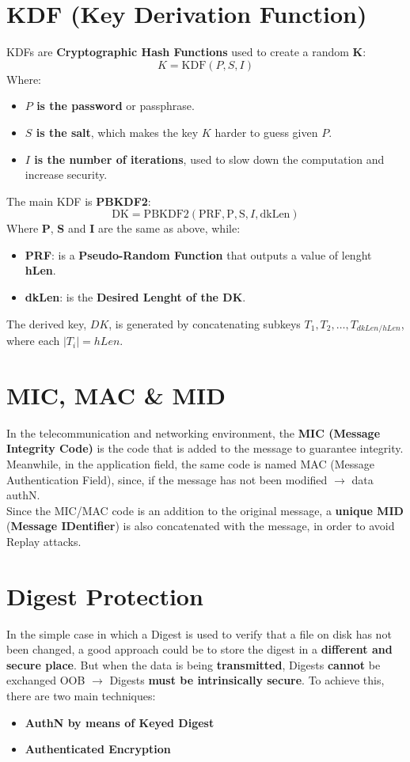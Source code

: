 \section{KDF (Key Derivation Function)}
KDFs are \textbf{Cryptographic Hash Functions} used to create a random \textbf{K}:
\[
K = \text{KDF}(P, S, I)
\]
Where:
\begin{itemize}
    \item \textbf{\( P \) is the password} or passphrase.
    \item \textbf{\( S \) is the salt}, which makes the key \( K \) harder to guess given \( P \).
    \item \textbf{\( I \) is the number of iterations}, used to slow down the computation and increase security.
\end{itemize}
\noindent
\begin{customquote}
The main KDF is \textbf{PBKDF2}:
\[
\text{DK} = \text{PBKDF2}(\text{PRF}, \text{P}, \text{S}, I, \text{dkLen})
\]
Where \textbf{P}, \textbf{S} and \textbf{I} are the same as above, while:
\begin{itemize}
    \item \textbf{PRF}: is a \textbf{Pseudo-Random Function} that outputs a value of lenght \textbf{hLen}.
    \item \textbf{dkLen}: is the \textbf{Desired Lenght of the DK}.
\end{itemize}
The derived key, \( DK \), is generated by concatenating subkeys \( T_1, T_2, \dots, T_{dkLen/hLen} \), where each \( |T_i| = hLen \).
\end{customquote}
\noindent{\color{gray!50}\rule{\textwidth}{0.5pt}}
\section{MIC, MAC \& MID}
In the telecommunication and networking environment, the \textbf{MIC (Message Integrity Code)} is the code that is added to the message to guarantee integrity. Meanwhile, in the application
field, the same code is named MAC (Message Authentication Field), since, if the message
has not been modified \(\rightarrow \) data authN.\\
Since the MIC/MAC code is an addition to the original message, a \textbf{unique MID} (\textbf{Message IDentifier}) is also concatenated with the message, in order to avoid Replay attacks.

\section{Digest Protection}
In the simple case in which a Digest is used to verify that a file on disk has not been changed, a good approach could be to store the digest in a \textbf{different and secure place}. But when the data is being \textbf{transmitted}, Digests \textbf{cannot} be exchanged OOB \(\rightarrow \) Digests \textbf{must be intrinsically secure}. To achieve this, there are two main techniques:
\begin{itemize}
    \item \textbf{AuthN by means of Keyed Digest}
    \item \textbf{Authenticated Encryption}
\end{itemize}

